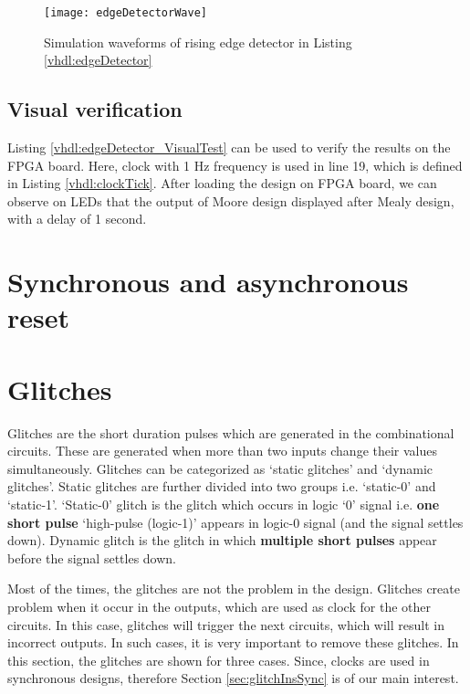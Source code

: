 \begin{figure}[!h]
	\centering
	\texttt{[image: edgeDetectorWave]}
	\caption{Simulation waveforms of rising edge detector in Listing \ref{vhdl:edgeDetector}}
	\label{fig:edgeDetectorWave}
\end{figure}

\subsection{Visual verification}
Listing \ref{vhdl:edgeDetector_VisualTest} can be used to verify the results on the FPGA board. Here, clock with 1 Hz frequency is used in line 19, which is defined in Listing \ref{vhdl:clockTick}. After loading the design on FPGA board, we can observe on LEDs that the output of Moore design displayed after  Mealy design, with a delay of 1 second.  



\section{Synchronous and asynchronous reset}

\section{Glitches} \label{sec:glitches}
Glitches are the short duration pulses which are generated in the combinational circuits. These are generated when more than two inputs change their values simultaneously. Glitches can be categorized as `static glitches' and `dynamic glitches'. Static glitches are further divided into two groups i.e. `static-0' and `static-1'. `Static-0' glitch is the glitch which occurs in logic `0' signal i.e. \textbf{one short pulse} `high-pulse (logic-1)' appears in logic-0 signal (and the signal settles down). Dynamic glitch is the glitch in which \textbf{multiple short pulses} appear before the signal settles down. 

\begin{noNumBox}
 Most of the times, the glitches are not the problem in the design. Glitches create problem when it occur in the outputs, which are used as clock for the other circuits. In this case, glitches will trigger the next circuits, which will result in incorrect outputs. In such cases, it is very important to remove these glitches. In this section, the glitches are shown for three cases. Since, clocks are used in synchronous designs, therefore Section \ref{sec:glitchInsSync} is of our main interest.
 \end{noNumBox} 
  
